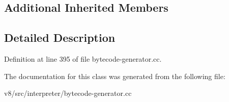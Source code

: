 \subsection*{Additional Inherited Members}


\subsection{Detailed Description}


Definition at line 395 of file bytecode-\/generator.\+cc.



The documentation for this class was generated from the following file\+:\begin{DoxyCompactItemize}
\item 
v8/src/interpreter/bytecode-\/generator.\+cc\end{DoxyCompactItemize}
